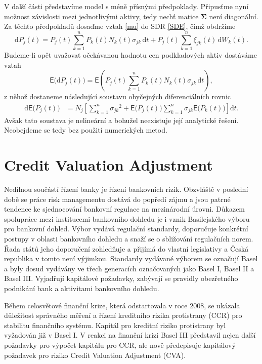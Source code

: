 \documentclass[a4paper,12pt]{report}
\theoremstyle{definition} \newtheorem{definice}[veta]{Definice}
\theoremstyle{remark}
\begin{document}
V další části představíme model s méně přísnými předpoklady.
Připusťme nyní možnost závislosti mezi jednotlivými aktivy, tedy nechť matice $\boldsymbol{\Sigma}$ není diagonální.
Za těchto předpokladů dosaďme vztah \eqref{mu} do SDR \eqref{SDE}, čímž obdržíme
\begin{equation*} 
 \mathrm{d}P_j(t)=P_j(t)\sum_{k=1}^{n}P_k(t)N_k(t)\sigma_{jk}\,\mathrm{d}t+P_j(t)\sum_{k=1}^{n}\xi_{jk}(t)\,\mathrm{d}W_k(t).
\end{equation*}
Budeme-li opět uvažovat očekávanou hodnotu  cen podkladových aktiv dostáváme vztah
\begin{equation*} 
\mathsf{E}\big( \mathrm{d}P_j(t)\big)=\mathsf{E}\left(P_j(t)\sum_{k=1}^{n}P_k(t)N_k(t)\sigma_{jk}\,\mathrm{d}t\right),
\end{equation*}
z něhož dostaneme následující soustavu obyčejných diferenciálních rovnic
\begin{align*}
\mathrm{d}\mathsf{E}\big(P_j(t)\big)&=N_j\left[\sum_{k=1}^{n}{\sigma_{jk}}^2+\mathsf{E}\big(P_j(t)\big)\sum_{k=1}^{n}\sigma_{jk}\mathsf{E}\big(P_k(t)\big)\right]\mathrm{d}t.
\end{align*}  
Avšak tato soustava je nelineární a bohužel neexistuje její analytické řešení.
Neobejdeme se tedy bez použití numerických metod.


\chapter{Credit Valuation Adjustment}

Nedílnou součástí řízení banky je řízení bankovních rizik.
Obzvláště v poslední době se práce risk managementu dostává do popředí zájmu
a jsou patrné tendence ke sjednocování bankovní regulace na mezinárodní úrovni.
Důkazem spolupráce mezi institucemi bankovního dohledu je i vznik Basilejského výboru pro bankovní dohled.
Výbor vydává regulační standardy, doporučuje konkrétní postupy v oblasti bankovního dohledu a snaží se o sbližování regulačních norem. 
Řada států jeho doporučení zohledňuje a přijímá do vlastní legislativy a Česká republika v tomto není výjimkou.
Standardy vydávané výborem se označují Basel a byly dosud vydávány ve třech generacích označovaných jako Basel I, Basel II a Basel III. 
Vyjadřují kapitálové požadavky, zabývají se pravidly obezřetného podnikání bank a aktivitami bankovního dohledu.

Během celosvětové finanční krize, která odstartovala v roce 2008, se ukázala důležitost správného měření a řízení kreditního rizika protistrany (CCR) pro stabilitu finančního systému.
Kapitál pro kreditní riziko protistrany byl vyžadován již v Basel I.  
V reakci na finanční krizi Basel III představil nejen další požadavky pro výpočet kapitálu pro CCR, ale nově
předepisuje kapitálový požadavek pro riziko Credit Valuation Adjustment (CVA). 
\end{document}
